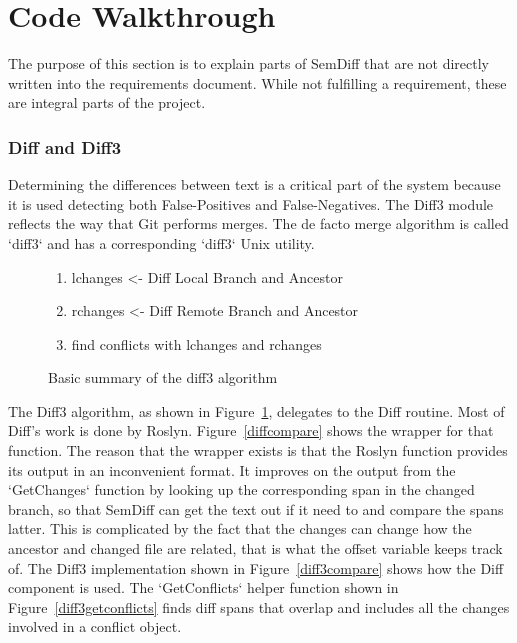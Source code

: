 \documentclass[draftclsnofoot,onecolumn]{IEEEtran}
\begin{document}
\section{Code Walkthrough}

The purpose of this section is to explain parts of SemDiff that are not 
directly written into the requirements document. While not fulfilling a 
requirement, these are integral parts of the project.

\subsubsection{Diff and Diff3}

Determining the differences between text is a critical part of the system 
because it is used detecting both False-Positives and False-Negatives. The 
Diff3 module reflects the way that Git performs merges. The de facto merge 
algorithm is called `diff3` and has a corresponding `diff3` Unix utility. 

\begin{figure}[!t]
\centering
\begin{enumerate}
\item lchanges <- Diff Local Branch and Ancestor
\item rchanges <- Diff Remote Branch and Ancestor
\item find conflicts with lchanges and rchanges
\end{enumerate}
\caption{Basic summary of the diff3 algorithm}
\label{diff3algorithm}
\end{figure}

The Diff3 algorithm, as shown in Figure~\ref{diff3algorithm}, delegates to 
the Diff routine. Most of Diff’s work is done by Roslyn. 
Figure~\ref{diffcompare} shows the wrapper for that function. The reason 
that the wrapper exists is that the Roslyn function provides its output in 
an inconvenient format. It improves on the output from the `GetChanges` 
function by looking up the corresponding span in the changed branch, so that 
SemDiff can get the text out if it need to and compare the spans latter. 
This is complicated by the fact that the changes can change how the ancestor 
and changed file are related, that is what the offset variable keeps track 
of. The Diff3 implementation shown in Figure~\ref{diff3compare} shows how 
the Diff component is used. The `GetConflicts` helper function shown in 
Figure~\ref{diff3getconflicts} finds diff spans that overlap and includes 
all the changes involved in a conflict object.
\end{document}
